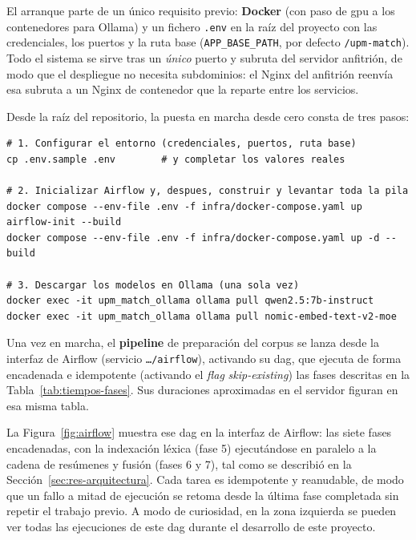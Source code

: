 El arranque parte de un único requisito previo: \textbf{Docker} (con paso de \gls{gpu} a los contenedores para Ollama) y un fichero \texttt{.env} en la raíz del proyecto con las credenciales, los puertos y la ruta base (\texttt{APP\_BASE\_PATH}, por defecto \texttt{/upm-match}).
Todo el sistema se sirve tras un \emph{único} puerto y subruta del servidor anfitrión, de modo que el despliegue no necesita subdominios: el Nginx del anfitrión reenvía esa subruta a un Nginx de contenedor que la reparte entre los servicios.

Desde la raíz del repositorio, la puesta en marcha desde cero consta de tres pasos:

\begin{lstlisting}[style=upmcode]
# 1. Configurar el entorno (credenciales, puertos, ruta base)
cp .env.sample .env        # y completar los valores reales

# 2. Inicializar Airflow y, despues, construir y levantar toda la pila
docker compose --env-file .env -f infra/docker-compose.yaml up airflow-init --build
docker compose --env-file .env -f infra/docker-compose.yaml up -d --build

# 3. Descargar los modelos en Ollama (una sola vez)
docker exec -it upm_match_ollama ollama pull qwen2.5:7b-instruct
docker exec -it upm_match_ollama ollama pull nomic-embed-text-v2-moe
\end{lstlisting}

Una vez en marcha, el \textbf{pipeline} de preparación del corpus se lanza desde la interfaz de Airflow (servicio \texttt{\ldots/airflow}), activando su \gls{dag}, que ejecuta de forma encadenada e idempotente (activando el \emph{flag} \emph{skip-existing}) las fases descritas en la Tabla~\ref{tab:tiempos-fases}.
Sus duraciones aproximadas en el servidor figuran en esa misma tabla.

La Figura~\ref{fig:airflow} muestra ese \gls{dag} en la interfaz de Airflow: las siete fases encadenadas, con la indexación léxica (fase 5) ejecutándose en paralelo a la cadena de resúmenes y fusión (fases 6 y 7), tal como se describió en la Sección~\ref{sec:res-arquitectura}.
Cada tarea es idempotente y reanudable, de modo que un fallo a mitad de ejecución se retoma desde la última fase completada sin repetir el trabajo previo.
A modo de curiosidad, en la zona izquierda se pueden ver todas las ejecuciones de este \gls{dag} durante el desarrollo de este proyecto.

